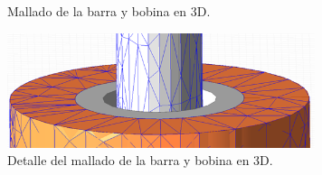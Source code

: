 \begin{itemize}
\begin{figure}[H]
        \caption{Mallado de la barra y bobina en 3D.}
        \label{fig:mesh3d} %
    \end{figure}
    \begin{figure}[H]
        \centering
        \includegraphics[width=9cm]{FigurasMemoria/meshDetail3d.png}
        \caption{Detalle del mallado de la barra y bobina en 3D.}
        \label{fig:meshDetail3d} %
    \end{figure}

    \vspace{5cm}
    

\end{itemize}
